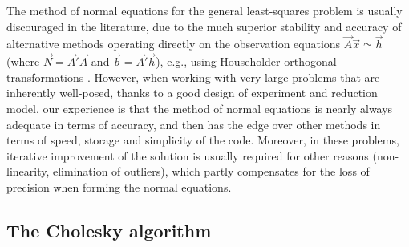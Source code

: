 \documentclass[structabstract]{aa}
\begin{document}
The method of normal equations for the general least-squares problem
is usually discouraged in the literature, due to the much superior 
stability and accuracy of alternative methods operating directly on 
the observation equations $\vec{A}\vec{x}\simeq\vec{h}$ (where 
$\vec{N}=\vec{A}'\vec{A}$ and $\vec{b}=\vec{A}'\vec{h}$),
e.g., using Householder orthogonal transformations 
\citep[e.g.,][]{book:bjork-1996}. However, when working with very
large problems that are inherently well-posed, thanks to a good 
design of experiment and reduction model, our experience is that 
the method of normal equations is nearly always adequate in terms 
of accuracy, and then has the edge over other methods in terms of
speed, storage and simplicity of the code. Moreover, in these
problems, iterative improvement of the solution is usually required
for other reasons (non-linearity, elimination of outliers), which 
partly compensates for the loss of precision when forming the
normal equations.

\subsection{The Cholesky algorithm}
\end{document}

